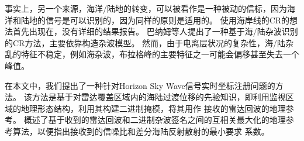 事实上，另一个来源，海洋/陆地的转变，可以被看作是一种被动的信标，因为海洋和陆地的信号是可以识别的，因为同样的原则是适用的。 使用海岸线的CR的想法首先出现在\cite{wheadon1994ionospheric, anderson1995auto}，没有详细的结果报告。 巴纳姆等人\cite{barnum1998over}提出了一种基于海/陆杂波识别的CR方法，主要依靠构造杂波模型。 然而，由于电离层状况的复杂性，海/陆杂乱的特征不稳定，例如海杂波，布拉格峰的主要特征之一可能会偏移甚至失去一个峰值。

在本文\cite{cuccoli2009over, cuccoli2009over2, cuccoli2010sea, cuccoli2011coordinate}中，我们提出了一种针对Horizon Sky Wave信号实时坐标注册问题的方法。 该方法是基于对雷达覆盖区域内的海陆过渡位移的先验知识，即利用监视区域的地理形态结构，利用其构建二进制掩模，将其用作 接收的雷达回波的地理参考。 概述了基于收到的雷达回波和二进制杂波签名之间的互相关最大化的地理参考算法，以便指出接收到的信噪比和差分海陆反射散射的最小要求 系数。

